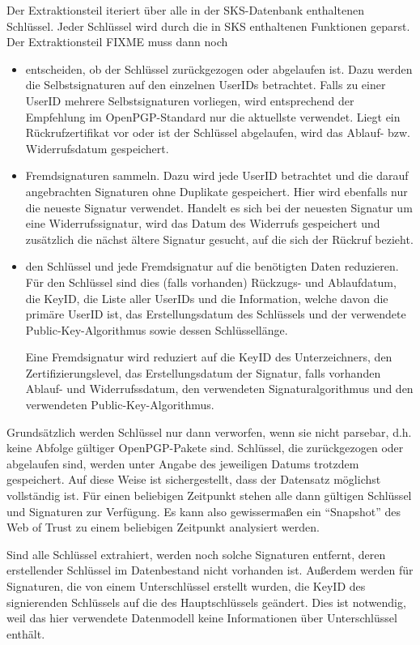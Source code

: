 Der Extraktionsteil iteriert über alle in der SKS-Datenbank
enthaltenen Schlüssel. Jeder Schlüssel wird durch die in SKS
enthaltenen Funktionen geparst. Der Extraktionsteil FIXME muss dann
noch
\begin{itemize}
\item entscheiden, ob der Schlüssel zurückgezogen oder abgelaufen
  ist. Dazu werden die Selbstsignaturen auf den einzelnen UserIDs
  betrachtet. Falls zu einer UserID mehrere Selbstsignaturen
  vorliegen, wird entsprechend der Empfehlung im OpenPGP-Standard nur
  die aktuellste verwendet. Liegt ein Rückrufzertifikat vor oder ist
  der Schlüssel abgelaufen, wird das Ablauf- bzw. Widerrufsdatum
  gespeichert.
\item Fremdsignaturen sammeln. Dazu wird jede UserID betrachtet und
  die darauf angebrachten Signaturen ohne Duplikate gespeichert. Hier
  wird ebenfalls nur die neueste Signatur verwendet. Handelt es sich
  bei der neuesten Signatur um eine Widerrufssignatur, wird das Datum
  des Widerrufs gespeichert und zusätzlich die nächst ältere Signatur
  gesucht, auf die sich der Rückruf bezieht.
\item den Schlüssel und jede Fremdsignatur auf die benötigten Daten
  reduzieren. Für den Schlüssel sind dies (falls vorhanden) Rückzugs-
  und Ablaufdatum, die KeyID, die Liste aller UserIDs und die
  Information, welche davon die primäre UserID ist, das
  Erstellungsdatum des Schlüssels und der verwendete
  Public-Key-Algorithmus sowie dessen Schlüssellänge.

  Eine Fremdsignatur wird reduziert auf die KeyID des Unterzeichners, 
  den Zertifizierungslevel, das Erstellungsdatum der Signatur,
  falls vorhanden Ablauf- und Widerrufssdatum, den verwendeten
  Signaturalgorithmus und den verwendeten Public-Key-Algorithmus.
\end{itemize}

Grundsätzlich werden Schlüssel nur dann verworfen, wenn sie nicht
parsebar, d.h. keine Abfolge gültiger OpenPGP-Pakete sind. Schlüssel,
die zurückgezogen oder abgelaufen sind, werden unter Angabe des
jeweiligen Datums trotzdem gespeichert. Auf diese Weise ist
sichergestellt, dass der Datensatz möglichst vollständig ist. Für
einen beliebigen Zeitpunkt stehen alle dann gültigen Schlüssel und
Signaturen zur Verfügung. Es kann also gewissermaßen ein
"`Snapshot"' des Web of Trust zu einem beliebigen Zeitpunkt
analysiert werden.

Sind alle Schlüssel extrahiert, werden noch solche Signaturen
entfernt, deren erstellender Schlüssel im Datenbestand nicht vorhanden
ist. Außerdem werden für Signaturen, die von einem Unterschlüssel
erstellt wurden, die KeyID des signierenden Schlüssels auf die des
Hauptschlüssels geändert. Dies ist notwendig, weil das hier
verwendete Datenmodell keine Informationen über Unterschlüssel
enthält.

